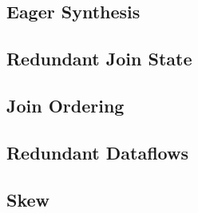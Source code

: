 \documentclass[../index.tex]{subfiles}
\begin{document}
\subsection{Eager Synthesis} \label{case-eagerness}


\subsection{Redundant Join State} \label{case-join-state}


\subsection{Join Ordering} \label{case-join-ordering}

\subsection{Redundant Dataflows} \label{case-redundant-dataflows}


\subsection{Skew} \label{case-skew}
\end{document}
